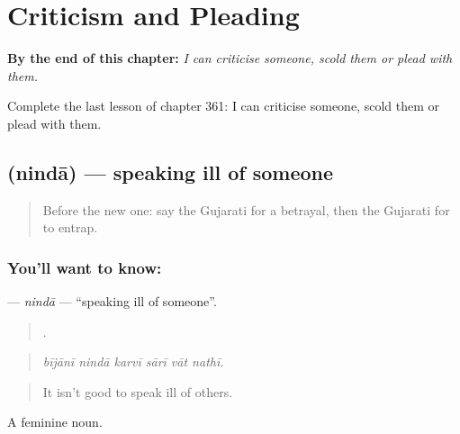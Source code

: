 
\chapter{Criticism and Pleading}
\label{ch:gu-criticism-and-pleading}

\begin{chapteropening}
\textbf{By the end of this chapter:} \emph{I can criticise someone, scold them or plead with them.}

Complete the last lesson of chapter 361: I can criticise someone, scold them or plead with them.
\end{chapteropening}

\section[\texorpdfstring{\gu{નિંદા} (nindā)}{નિંદા (nindā)}]{ (nindā) — speaking ill of someone}

\label{lesson:GU-C361-ninda}



\begin{quote}
Before the new one: say the Gujarati for a betrayal, then the Gujarati for to entrap.
\end{quote}

\subsection*{You'll want to know: }
\textbf{} — \emph{nindā} — \textquotedblleft{}speaking ill of someone\textquotedblright{}.

\begin{quote}
     .
\end{quote}

\begin{quote}
\emph{bījānī nindā karvī sārī vāt nathī.}
\end{quote}

\begin{quote}
It isn't good to speak ill of others.
\end{quote}

A feminine noun.

